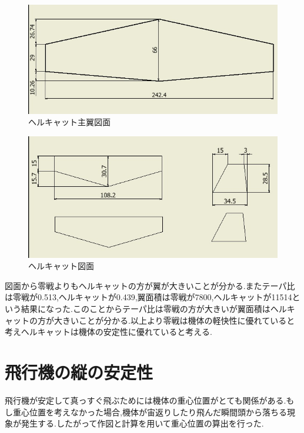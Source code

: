 \begin{figure}[htbp]
  \begin{center}
    \includegraphics[width=140mm]{guramanmainwing.JPG}
    \end{center}
  \caption{ヘルキャット主翼図面}
 \label{fig:guramanmainwing}
\end{figure}

\begin{figure}[htbp]
  \begin{center}
    \includegraphics[width=140mm]{guramantail.JPG}
    \end{center}
  \caption{ヘルキャット図面}
 \label{fig:guramantail}
\end{figure}

図面から零戦よりもヘルキャットの方が翼が大きいことが分かる.またテーパ比は零戦が0.513,ヘルキャットが0.439,翼面積は零戦が7800,ヘルキャットが11514という結果になった.このことからテーパ比は零戦の方が大きいが翼面積はヘルキャットの方が大きいことが分かる.以上より零戦は機体の軽快性に優れていると考えヘルキャットは機体の安定性に優れていると考える.

\section{飛行機の縦の安定性}
飛行機が安定して真っすぐ飛ぶためには機体の重心位置がとても関係がある.もし重心位置を考えなかった場合,機体が宙返りしたり飛んだ瞬間頭から落ちる現象が発生する.したがって作図と計算を用いて重心位置の算出を行った.
